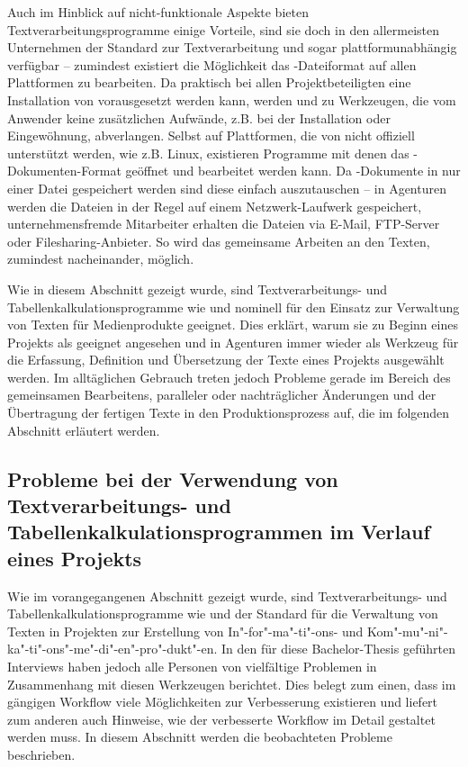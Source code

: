 \bigskip

Auch im Hinblick auf nicht-funktionale Aspekte bieten Textverarbeitungsprogramme einige Vorteile, sind sie doch in den allermeisten Unternehmen der Standard zur Textverarbeitung und sogar plattformunabhängig verfügbar -- zumindest existiert die Möglichkeit das -Dateiformat auf allen Plattformen zu bearbeiten. Da praktisch bei allen Projektbeteiligten eine Installation von  vorausgesetzt werden kann, werden  und  zu  Werkzeugen, die vom Anwender keine zusätzlichen Aufwände, z.B. bei der Installation oder Eingewöhnung, abverlangen. Selbst auf Plattformen, die von  nicht offiziell unterstützt werden, wie z.B. Linux, existieren Programme mit denen das -Dokumenten-Format geöffnet und bearbeitet werden kann. Da -Dokumente in nur einer Datei gespeichert werden sind diese einfach auszutauschen -- in Agenturen werden die Dateien in der Regel auf einem Netzwerk-Laufwerk gespeichert, unternehmensfremde Mitarbeiter erhalten die Dateien via E-Mail, FTP-Server oder Filesharing-Anbieter. So wird das gemeinsame Arbeiten an den Texten, zumindest nacheinander, möglich. 

\secbar

Wie in diesem Abschnitt gezeigt wurde, sind Textverarbeitungs- und Tabellenkalkulationsprogramme wie   und  nominell für den Einsatz zur Verwaltung von Texten für Medienprodukte geeignet. Dies erklärt, warum sie zu Beginn eines Projekts als geeignet angesehen und in Agenturen immer wieder als Werkzeug für die Erfassung, Definition und Übersetzung der Texte eines Projekts ausgewählt werden. Im alltäglichen Gebrauch treten jedoch Probleme gerade im Bereich des gemeinsamen Bearbeitens, paralleler oder nachträglicher Änderungen und der Übertragung der fertigen Texte in den Produktionsprozess auf, die im folgenden Abschnitt erläutert werden.

\pagebreak

\subsection{Probleme bei der Verwendung von Textverarbeitungs- und Tabellenkalkulationsprogrammen im Verlauf eines Projekts}
\label{l:officeprobleme}

Wie im vorangegangenen Abschnitt gezeigt wurde, sind Textverarbeitungs- und Tabellenkalkulationsprogramme wie   und  der Standard für die Verwaltung von Texten in Projekten zur Erstellung von In"-for"-ma"-ti"-ons- und Kom"-mu"-ni"-ka"-ti"-ons"-me"-di"-en"-pro"-dukt"-en. In den für diese Bachelor-Thesis geführten Interviews haben jedoch alle Personen von vielfältige Problemen in Zusammenhang mit diesen Werkzeugen berichtet. Dies belegt zum einen, dass im gängigen Workflow viele Möglichkeiten zur Verbesserung existieren und liefert zum anderen auch Hinweise, wie der verbesserte Workflow im Detail gestaltet werden muss. In diesem Abschnitt werden die beobachteten Probleme beschrieben.

